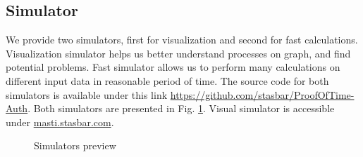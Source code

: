 \documentclass[nostrict]{szablonPG}
\begin{document}
\subsection{Simulator}
We provide two simulators, first for visualization and second for fast calculations. Visualization simulator helps us better understand processes on graph, and find potential problems. Fast simulator allows us to perform many calculations on different input data in reasonable period of time. The source code for both simulators is available under this link \url{https://github.com/stasbar/ProofOfTime-Auth}. Both simulators are presented in Fig. \ref{fig:simulators}. Visual simulator is accessible under \url{masti.stasbar.com}.
\begin{figure}[h!]
 \hfill 	
\caption{Simulators preview}
\label{fig:simulators}
\end{figure}
\end{document}
